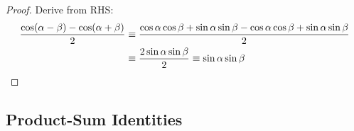 \documentclass[fleqn,a4paper,11pt]{article}
\begin{document}
    \begin{proof}
    Derive from RHS:
    \begin{align*}
    \frac{\cos(\alpha - \beta) - \cos(\alpha + \beta)} 2 &\equiv
     \frac{\cos \alpha \cos \beta + \sin \alpha \sin \beta -
           \cos \alpha \cos \beta + \sin \alpha \sin \beta} 2 \\
    &\equiv \frac{2 \sin \alpha \sin \beta} 2 \equiv \sin \alpha \sin \beta
        \qedhere
    \end{align*}
    \end{proof}

    \subsection{Product-Sum Identities} \label{sec_trig_product_sum}

\end{document}
